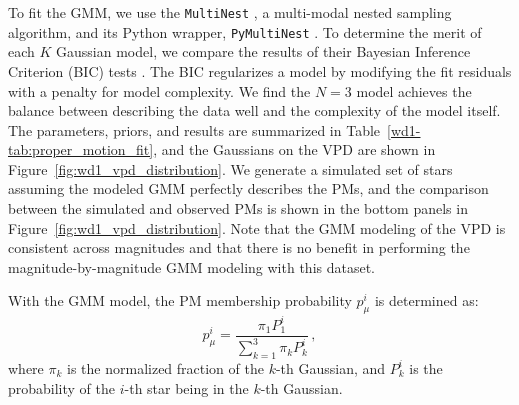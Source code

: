 \documentclass[12pt]{ucsddissertation}
\newcommand{\pmui}{p_{\mu}^i}
\begin{document}
\begin{CJK*}{UTF8}{gbsn}
To fit the GMM, we use the \texttt{MultiNest} \citep[][]{Feroz-2009}, a multi-modal nested sampling algorithm, and its Python wrapper, \texttt{PyMultiNest} \citep{Buchner-2014}. 
To determine the merit of each $K$ Gaussian model, we compare the results of their Bayesian Inference Criterion (BIC) tests \citep{Schwarz-1978}. The BIC regularizes a model by modifying the fit residuals with a penalty for model complexity. We find the $N = 3$ model achieves the balance between describing the data well and the complexity of the model itself. The parameters, priors, and results are summarized in Table~\ref{wd1-tab:proper_motion_fit}, and the Gaussians on the VPD are shown in Figure~\ref{fig:wd1_vpd_distribution}. We generate a simulated set of stars assuming the modeled GMM perfectly describes the PMs, and the comparison between the simulated and observed PMs is shown in the bottom panels in Figure~\ref{fig:wd1_vpd_distribution}. Note that the GMM modeling of the VPD is consistent across magnitudes and that there is no benefit in performing the magnitude-by-magnitude GMM modeling with this dataset.

With the GMM model, the PM membership probability $\pmui$ is determined as:
\begin{equation}
    \pmui = \frac{\pi_1 P_1^i}{\sum_{k=1}^3 \pi_k P_k^i}\,,
\end{equation}
where $\pi_k$ is the normalized fraction of the $k$-th Gaussian, and $P_k^i$ is the probability of the $i$-th star being in the $k$-th Gaussian. 


\end{CJK*}
\end{document}
